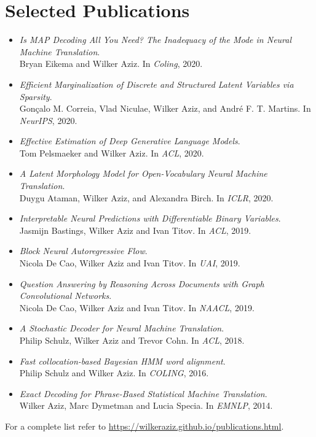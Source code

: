 \section*{Selected Publications}




\begin{itemize}
	 \setlength\itemsep{1pt}
	\item \emph{Is MAP Decoding All You Need? The Inadequacy of the Mode in Neural Machine Translation}.\\
	Bryan Eikema and Wilker Aziz. In \emph{Coling}, 2020. 
	\item \emph{Efficient Marginalization of Discrete and Structured Latent Variables via Sparsity}.\\
	Gonçalo M. Correia, Vlad Niculae, Wilker Aziz, and André F. T. Martins. In \emph{NeurIPS}, 2020. 
	\item \emph{Effective Estimation of Deep Generative Language Models}.\\
	Tom Pelsmaeker and Wilker Aziz. In \emph{ACL}, 2020. 
	\item \emph{A Latent Morphology Model for Open-Vocabulary Neural Machine Translation}.\\
	Duygu Ataman, Wilker Aziz, and Alexandra Birch. In \emph{ICLR}, 2020. 
	\item \emph{Interpretable Neural Predictions with Differentiable Binary Variables}.\\
	Jasmijn Bastings, Wilker Aziz and Ivan Titov. In \emph{ACL}, 2019. 
	\item \emph{Block Neural Autoregressive Flow}.\\
	Nicola De Cao, Wilker Aziz and Ivan Titov. In \emph{UAI}, 2019. 
	\item \emph{Question Answering by Reasoning Across Documents with Graph Convolutional Networks}.\\
	Nicola De Cao, Wilker Aziz and Ivan Titov. In \emph{NAACL}, 2019.
	\item \emph{A Stochastic Decoder for Neural Machine Translation}.\\
	Philip Schulz, Wilker Aziz and Trevor Cohn. In \emph{ACL}, 2018. 
	\item \emph{Fast collocation-based Bayesian HMM word alignment}. \\
	Philip Schulz and Wilker Aziz. In \emph{COLING}, 2016. 
	\item \emph{Exact Decoding for Phrase-Based Statistical Machine Translation}. \\
	Wilker Aziz, Marc Dymetman and Lucia Specia. In \emph{EMNLP}, 2014.
\end{itemize}

For a complete list refer to \url{https://wilkeraziz.github.io/publications.html}. 




